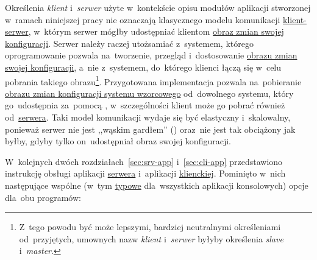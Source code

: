\documentclass[thesis]{subfiles}
\begin{document}
Określenia \emph{klient} i~\emph{serwer} użyte w~kontekście opisu modułów aplikacji stworzonej w~ramach niniejszej pracy nie oznaczają klasycznego modelu komunikacji \href{https://en.wikipedia.org/wiki/Client\%E2\%80\%93server\_model}{klient-serwer}, w~którym serwer mógłby udostępniać klientom \hyperref[sec:obraz-zmian-konfiguracji]{obraz zmian swojej konfiguracji}. Serwer należy raczej utożsamiać z~systemem, którego oprogramowanie pozwala na~tworzenie, przegląd i~dostosowanie \hyperref[sec:obraz-zmian-konfiguracji]{obrazu zmian swojej konfiguracji}, a~nie z~systemem, do~którego klienci łączą się w~celu pobrania takiego obrazu\footnote{Z~tego powodu być może lepszymi, bardziej neutralnymi określeniami od~przyjętych, umownych nazw \emph{klient} i~\emph{serwer} byłyby określenia \emph{slave} i~\emph{master}.}. Przygotowana implementacja pozwala na~pobieranie \hyperref[sec:obraz-zmian-konfiguracji]{obrazu zmian konfiguracji systemu wzorcowego} od~dowolnego systemu, który go~udostępnia za~pomocą \sftp{}, w~szczególności klient może go pobrać również od~\hyperref[sec:srv-app]{serwera}. Taki model komunikacji wydaje się być elastyczny i~skalowalny, ponieważ serwer nie jest ,,wąskim gardłem'' () oraz~nie jest tak obciążony jak byłby, gdyby tylko on~udostępniał obraz swojej konfiguracji.

W~kolejnych dwóch rozdziałach~\ref{sec:srv-app} i~\ref{sec:cli-app} przedstawiono instrukcję obsługi aplikacji \hyperref[sec:srv-app]{serwera} i~aplikacji \hyperref[sec:cli-app]{klienckiej}. Pominięto w~nich następujące wspólne (w~tym \href{https://www.gnu.org/prep/standards/html_node/Command_002dLine-Interfaces.html}{typowe} dla~wszystkich aplikacji konsolowych) opcje dla~obu programów:
\end{document}
